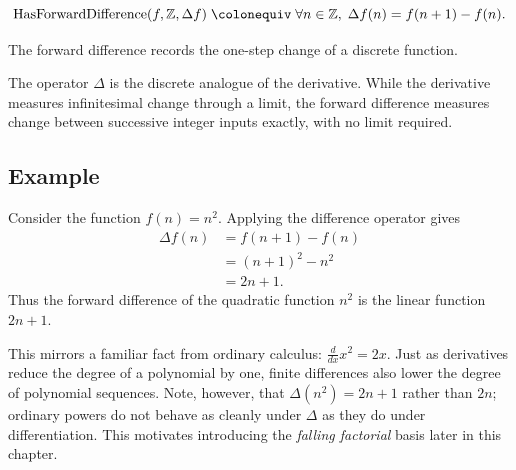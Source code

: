 \begin{remark*}
\[
  \operatorname{HasForwardDifference}(f,\mathbb Z,\Delta f)
  \;\colonequiv\;
  \forall n\in\mathbb Z,\; \Delta f(n)=f(n+1)-f(n).
\]
\end{remark*}

\begin{remark*}[Interpretation]
The forward difference records the one-step change of a discrete function.


The operator \(\Delta\) is the discrete analogue of the derivative.
While the derivative measures infinitesimal change through a limit,
the forward difference measures change between successive integer inputs
exactly, with no limit required.
\end{remark*}

\subsection*{Example}

\begin{example*}
Consider the function \(f(n) = n^2\). Applying the difference operator gives
\[
\begin{aligned}
\Delta f(n)
&= f(n+1) - f(n) \\
&= (n+1)^2 - n^2 \\
&= 2n + 1.
\end{aligned}
\]
Thus the forward difference of the quadratic function \(n^2\) is the linear
function \(2n+1\).
\end{example*}

\begin{remark*}[Interpretation]
This mirrors a familiar fact from ordinary calculus: \(\tfrac{d}{dx} x^2 = 2x\).
Just as derivatives reduce the degree of a polynomial by one,
finite differences also lower the degree of polynomial sequences.
Note, however, that \(\Delta(n^2) = 2n+1\) rather than \(2n\); ordinary
powers do not behave as cleanly under \(\Delta\) as they do under
differentiation. This motivates introducing the \emph{falling factorial}
basis later in this chapter.
\end{remark*}
